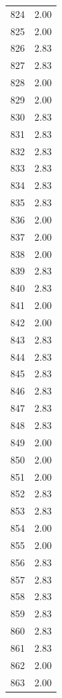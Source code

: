 \documentclass[a4paper,11pt]{article}
\begin{document}
\begin{center}
\begin{longtable}{|R{1.5cm}|R{2.5cm}|}
  824  &         2.00 \\ 
  825  &         2.00 \\ 
  826  &         2.83 \\ 
  827  &         2.83 \\ 
  828  &         2.00 \\ 
  829  &         2.00 \\ 
  830  &         2.83 \\ 
  831  &         2.83 \\ 
  832  &         2.83 \\ 
  833  &         2.83 \\ 
  834  &         2.83 \\ 
  835  &         2.83 \\ 
  836  &         2.00 \\ 
  837  &         2.00 \\ 
  838  &         2.00 \\ 
  839  &         2.83 \\ 
  840  &         2.83 \\ 
  841  &         2.00 \\ 
  842  &         2.00 \\ 
  843  &         2.83 \\ 
  844  &         2.83 \\ 
  845  &         2.83 \\ 
  846  &         2.83 \\ 
  847  &         2.83 \\ 
  848  &         2.83 \\ 
  849  &         2.00 \\ 
  850  &         2.00 \\ 
  851  &         2.00 \\ 
  852  &         2.83 \\ 
  853  &         2.83 \\ 
  854  &         2.00 \\ 
  855  &         2.00 \\ 
  856  &         2.83 \\ 
  857  &         2.83 \\ 
  858  &         2.83 \\ 
  859  &         2.83 \\ 
  860  &         2.83 \\ 
  861  &         2.83 \\ 
  862  &         2.00 \\ 
  863  &         2.00 \\ 

\end{longtable}
\end{center}
\end{document}
